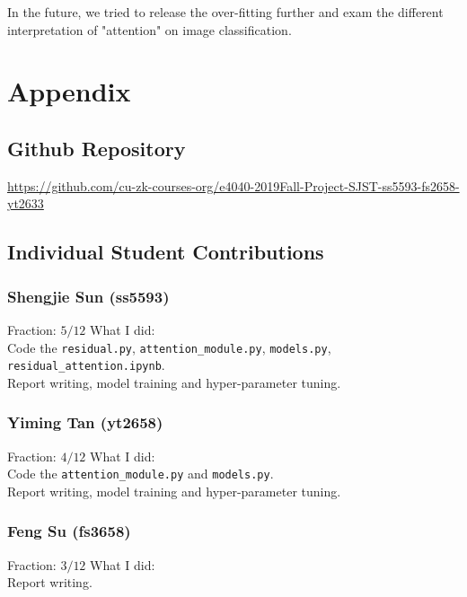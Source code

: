 \documentclass{article}
\begin{document}
\begin{multicols}{2}
In the future, we tried to release the over-fitting further and exam the different interpretation of "attention" on image classification. 





\section{Appendix}
\subsection{Github Repository}
\href{https://github.com/cu-zk-courses-org/e4040-2019Fall-Project-SJST-ss5593-fs2658-yt2633}{https://github.com/cu-zk-courses-org/e4040-2019Fall-Project-SJST-ss5593-fs2658-yt2633}

\subsection{Individual Student Contributions}
\subsubsection*{Shengjie Sun (ss5593)}
{Fraction:} 
$5/12$
{What I did:} \\
Code the \texttt{residual.py}, \texttt{attention\_module.py}, \texttt{models.py}, \texttt{residual\_attention.ipynb}. \\
Report writing, model training and hyper-parameter tuning.

\subsubsection*{Yiming Tan (yt2658)}
{Fraction:} 
$4/12$
{What I did:} \\
Code the \texttt{attention\_module.py} and \texttt{models.py}. \\
Report writing, model training and hyper-parameter tuning.

\subsubsection*{Feng Su (fs3658)}
{Fraction:} 
$3/12$
{What I did:} \\
Report writing.


\end{multicols}
\end{document}
